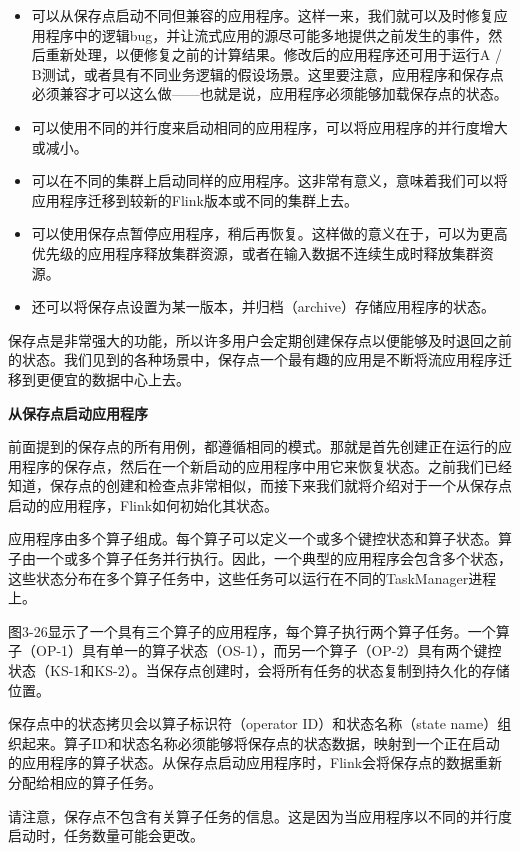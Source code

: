 \documentclass[cn,11pt,chinese]{elegantbook}
\begin{document}
\begin{itemize}
\item 可以从保存点启动不同但兼容的应用程序。这样一来，我们就可以及时修复应用程序中的逻辑bug，并让流式应用的源尽可能多地提供之前发生的事件，然后重新处理，以便修复之前的计算结果。修改后的应用程序还可用于运行A / B测试，或者具有不同业务逻辑的假设场景。这里要注意，应用程序和保存点必须兼容才可以这么做——也就是说，应用程序必须能够加载保存点的状态。
\item 可以使用不同的并行度来启动相同的应用程序，可以将应用程序的并行度增大或减小。
\item 可以在不同的集群上启动同样的应用程序。这非常有意义，意味着我们可以将应用程序迁移到较新的Flink版本或不同的集群上去。
\item 可以使用保存点暂停应用程序，稍后再恢复。这样做的意义在于，可以为更高优先级的应用程序释放集群资源，或者在输入数据不连续生成时释放集群资源。
\item 还可以将保存点设置为某一版本，并归档（archive）存储应用程序的状态。
\end{itemize}

保存点是非常强大的功能，所以许多用户会定期创建保存点以便能够及时退回之前的状态。我们见到的各种场景中，保存点一个最有趣的应用是不断将流应用程序迁移到更便宜的数据中心上去。

\textbf{从保存点启动应用程序}

前面提到的保存点的所有用例，都遵循相同的模式。那就是首先创建正在运行的应用程序的保存点，然后在一个新启动的应用程序中用它来恢复状态。之前我们已经知道，保存点的创建和检查点非常相似，而接下来我们就将介绍对于一个从保存点启动的应用程序，Flink如何初始化其状态。

应用程序由多个算子组成。每个算子可以定义一个或多个键控状态和算子状态。算子由一个或多个算子任务并行执行。因此，一个典型的应用程序会包含多个状态，这些状态分布在多个算子任务中，这些任务可以运行在不同的TaskManager进程上。

图3-26显示了一个具有三个算子的应用程序，每个算子执行两个算子任务。一个算子（OP-1）具有单一的算子状态（OS-1），而另一个算子（OP-2）具有两个键控状态（KS-1和KS-2）。当保存点创建时，会将所有任务的状态复制到持久化的存储位置。

保存点中的状态拷贝会以算子标识符（operator ID）和状态名称（state name）组织起来。算子ID和状态名称必须能够将保存点的状态数据，映射到一个正在启动的应用程序的算子状态。从保存点启动应用程序时，Flink会将保存点的数据重新分配给相应的算子任务。

\begin{note}
    请注意，保存点不包含有关算子任务的信息。这是因为当应用程序以不同的并行度启动时，任务数量可能会更改。
\end{note}
\end{document}
